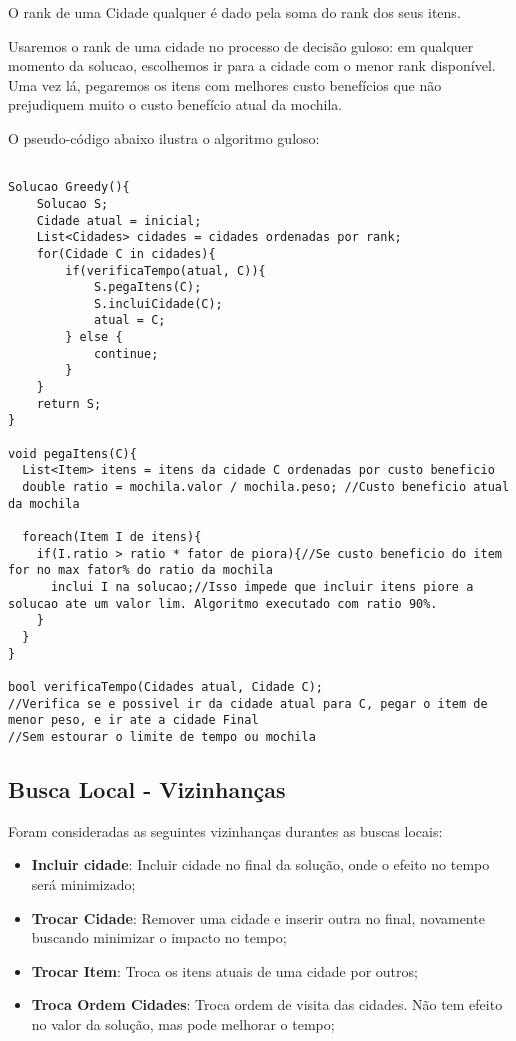 \documentclass[12pt,14paper,onecolumn]{article}
\begin{document}
O rank de uma Cidade qualquer é dado pela soma do rank dos seus itens.

Usaremos o rank de uma cidade no processo de decisão guloso: em qualquer momento da solucao, escolhemos ir para a cidade com o menor rank disponível. Uma vez lá, pegaremos os itens com melhores custo benefícios que não prejudiquem muito o custo benefício atual da mochila.

O pseudo-código abaixo ilustra o algoritmo guloso:

\begin{lstlisting}

Solucao Greedy(){
	Solucao S;
	Cidade atual = inicial;
	List<Cidades> cidades = cidades ordenadas por rank;
	for(Cidade C in cidades){
		if(verificaTempo(atual, C)){
			S.pegaItens(C);
			S.incluiCidade(C);
			atual = C;
		} else {
			continue;
		}
	}
	return S;
}

void pegaItens(C){
  List<Item> itens = itens da cidade C ordenadas por custo beneficio
  double ratio = mochila.valor / mochila.peso; //Custo beneficio atual da mochila

  foreach(Item I de itens){
    if(I.ratio > ratio * fator de piora){//Se custo beneficio do item for no max fator% do ratio da mochila
      inclui I na solucao;//Isso impede que incluir itens piore a solucao ate um valor lim. Algoritmo executado com ratio 90%.
    }
  }
}

bool verificaTempo(Cidades atual, Cidade C);
//Verifica se e possivel ir da cidade atual para C, pegar o item de menor peso, e ir ate a cidade Final
//Sem estourar o limite de tempo ou mochila

\end{lstlisting}

\subsection{Busca Local - Vizinhanças}
Foram consideradas as seguintes vizinhanças durantes as buscas locais:

\begin{itemize}
\item \textbf{Incluir cidade}: Incluir cidade no final da solução, onde o efeito no tempo será minimizado;
			
\item \textbf{Trocar Cidade}: Remover uma cidade e inserir outra no final, novamente buscando minimizar o impacto no tempo;
		
\item \textbf{Trocar Item}: Troca os itens atuais de uma cidade por outros;
		
\item \textbf{Troca Ordem Cidades}: Troca ordem de visita das cidades. Não tem efeito no valor da solução, mas pode melhorar o tempo;

\end{itemize}
\end{document}
